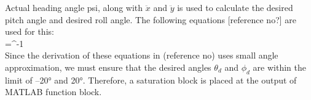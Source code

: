 Actual heading angle psi, along with $\ddot{x}$ and $\ddot{y}$ is used to calculate the desired pitch angle and desired roll angle. The following equations [reference no?] are used for this: \\

=^{-1}  \\


Since the derivation of these equations in (reference no) uses small angle approximation, we must ensure that the desired angles $\theta_{d}$ and $\phi_{d}$ are within the limit of –20° and 20°. Therefore, a saturation block is placed at the output of MATLAB function block.   

